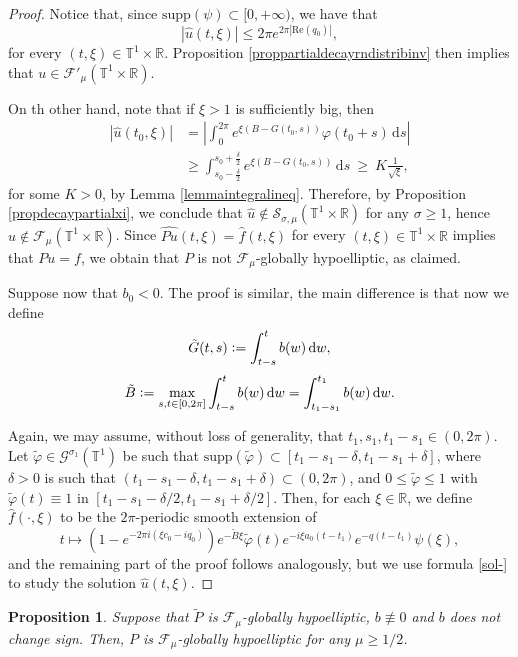 \documentclass[11pt,reqno]{amsart}
\numberwithin{equation}{section}
\newtheorem{prop}[theorem]{Proposition}
\theoremstyle{definition}
\theoremstyle{definition}
\newcommand{\supp}{\text{supp}}
\newcommand{\T}{\mathbb{T}}
\newcommand{\R}{\mathbb{R}}
\newcommand{\g}{\mathbb{T}^1\times\mathbb{R}}
\newcommand{\Real}{\mathrm{Re}}
\newcommand{\Smu}{\mathscr{F}_{\mu}(\T^1\times\R)}
\newcommand{\SSmu}{\mathscr{F}'_{\mu}(\T^1\times\R)}
\newcommand{\defeq}{\vcentcolon=}
\begin{document}
\begin{proof}
    Notice that, since $\supp(\psi)\subset [0,+\infty)$, we have that
    $$|\widehat{u}(t,\xi)|\leq 2\pi e^{2\pi|\Real(q_0)|},$$
    for every $(t,\xi)\in\g$.  Proposition \ref{proppartialdecayrndistribinv} then implies that $u\in\SSmu$.

    On th other hand, note that if $\xi>1$ is sufficiently big, then
    \begin{align*}
        |\widehat{u}(t_0,\xi)|&=\left|\int_0^{2\pi}e^{\xi(B-G(t_0,s))}\varphi(t_0+s)\,\mathrm{d}s\right|\\
        &\geq \int_{s_0-\frac{\delta}{2}}^{s_0+\frac{\delta}{2}}e^{\xi(B-G(t_0,s))}\,\mathrm{d}s\ \geq\ K\frac{1}{\sqrt{\xi}},
    \end{align*}
    for some $K>0$, by Lemma \ref{lemmaintegralineq}. Therefore, by Proposition \ref{propdecaypartialxi}, we conclude that $\widehat{u}\not\in\mathcal{S}_{\sigma,\mu}(\g)$ for any $\sigma\geq 1$, hence $u\not\in\Smu$. Since  $\widehat{Pu}(t,\xi)=\widehat{f}(t,\xi)$ for every $(t,\xi)\in\T^1\times\R$ implies that $Pu=f$, we obtain that $P$ is not $\mathscr{F}_{\mu}$-globally hypoelliptic, as claimed.
    
    Suppose now that $b_0<0$. The proof is similar, the main difference is that now we define
    \begin{equation*}
    \tilde G(t,s) \defeq\int_{t-s}^{t}b(w)\,\mathrm{d}w,
    \end{equation*}
    \begin{equation*}
        \tilde B\defeq\max_{s,t\in[0,2\pi]}\int_{t-s}^tb(w)\,\mathrm{d}w=\int_{t_1-s_1}^{t_1}b(w)\,\mathrm{d}w.
    \end{equation*}
    
    Again, we may assume, without loss of generality, that $t_1,s_1,t_1-s_1\in(0,2\pi)$. Let $\tilde{\varphi}\in \mathscr{G}^{\sigma_1}(\T^1)$ be such that $\supp(\tilde{\varphi})\subset[t_1-s_1-\delta,t_1-s_1+\delta]$, where $\delta>0$ is such that $(t_1-s_1-\delta ,t_1-s_1+\delta)\subset(0,2\pi)$, and $0\leq \tilde \varphi\leq 1$ with $\tilde \varphi(t)\equiv1$ in $[t_1-s_1-\delta/2,t_1-s_1+\delta/2]$. Then, for each $\xi\in\R$, we define $\widehat{f}(\cdot,\xi)$ to be the $2\pi$-periodic smooth extension of
    $$t\mapsto\left(1-e^{-2\pi i(\xi c_0-iq_0)}\right)e^{-\tilde{B}\xi}\tilde{\varphi}(t)e^{-i\xi a_0(t-t_1)}e^{-q(t-t_1)}\psi(\xi),$$
    and the remaining part of the proof follows analogously, but we use formula \eqref{sol-} to study the solution $\widehat{u}(t,\xi)$.
\end{proof}
\begin{prop}
    Suppose that $\tilde P$ is $\mathscr{F}_{\mu}$-globally hypoelliptic, $b\not\equiv 0$ and $b$ does not change sign. Then, $P$ is $\mathscr{F}_{\mu}$-globally hypoelliptic for any $\mu\geq 1/2$.
\end{prop}
\end{document}
